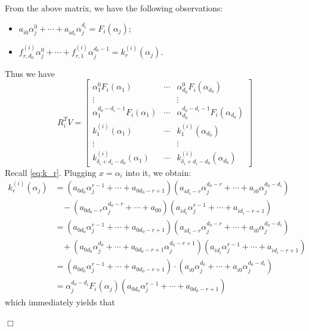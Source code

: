 \documentclass{article}
\newenvironment{proof}{\noindent{\em Proof:}}{$\Box$~\\}
\begin{document}
\begin{proof}
\begin{enumerate}
From the above matrix, we have the following observations:
\begin{itemize}
  \item $a_{i0}^{}\alpha _j^0 +  \cdots  + a_{i{d_i}}^{}\alpha _j^{{d_i}} = {F_i}({\alpha _j})$;
  \item $f_{r,{d_0}}^{(i)}\alpha _j^0 +  \cdots  + f_{r,1}^{(i)}\alpha _j^{{d_0} - 1} = k_r^{(i)}({\alpha _j})$.
\end{itemize}
Thus we have
$${R_i^TV} = \left[ {\begin{array}{*{20}{c}}
{\alpha _1^0{F_i}({\alpha _1})}& \cdots &{\alpha _{{d_0}}^0{F_i}({\alpha _{{d_0}}})}\\
 \vdots &{}& \vdots \\
{\alpha _1^{{d_0} - {d_i} - 1}{F_i}({\alpha _1})}& \cdots &{\alpha _{{d_0}}^{{d_0} - {d_i} - 1}{F_i}({\alpha _{{d_0}}})}\\
\hline
{k_1^{(i)}({\alpha _1})}& \cdots &{k_1^{(i)}({\alpha _{{d_0}}})}\\
 \vdots &{}& \vdots \\
{k_{{\delta _i} + {d_i} - {d_0}}^{(i)}({\alpha _1})}& \cdots &{k_{{\delta _i} + {d_i} - {d_0}}^{(i)}({\alpha _{{d_0}}})}
\end{array}} \right]$$
Recall \eqref{eq:k_r}. Plugging $x=\alpha_i$ into it, we obtain:
\begin{align*}
    k_r^{(i)}({\alpha _j}) &= ({a_{{0d_0}}}\alpha _j^{r - 1} +  \cdots  + {a_{{0d_0} - r + 1}})(a_{i{d_i} - r}^{}\alpha _j^{{d_0} - r} +  \cdots  + a_{i0}^{}\alpha _j^{{d_0} - {d_i}}) \\
     & \  \ \ \  -({a_{{0d_0} - r}}\alpha _j^{{d_0} - r} +  \cdots  + {a_{00}})(a_{i{d_i}}^{}\alpha _j^{r - 1} +  \cdots  + a_{i{d_i} - r + 1}^{}) \\
    &= ({a_{{0d_0}}}\alpha _j^{r - 1} +  \cdots  + {a_{{0d_0} - r + 1}})(a_{i{d_i} - r}^{}\alpha _j^{{d_0} - r} +  \cdots  + a_{i0}^{}\alpha _j^{{d_0} - {d_i}})\\
    &\ \ \  \ + ({a_{{0d_0}}}\alpha _j^{{d_0}} +  \cdots  + {a_{{0d_0} - r + 1}}\alpha _j^{{d_0} - r + 1})(a_{i{d_i}}^{}\alpha _j^{r - 1} +  \cdots  + a_{i{d_i} - r + 1}^{})\\
    &=({a_{{0d_0}}}\alpha _j^{r - 1} +  \cdots  + {a_{{0d_0} - r + 1}})\cdot(a_{i0}^{}\alpha _j^{{d_0}} +  \cdots  + a_{i0}^{}\alpha _j^{{d_0} - {d_i}})\\
    &=\alpha _j^{{d_0} - {d_i}}{F_i}({\alpha _j})({a_{{0d_0}}}\alpha _j^{r - 1} +  \cdots  + {a_{{0d_0} - r + 1}})
\end{align*}
which immediately yields that

\end{enumerate}
\end{proof}
\end{document}
